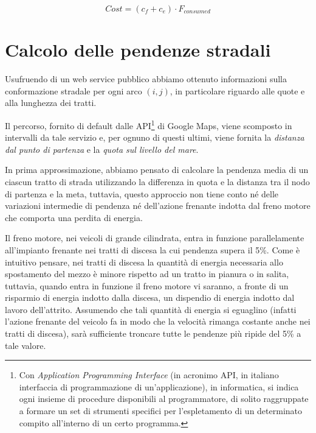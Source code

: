 	\begin{equation}
		\label{eq:overall_cost}
		Cost = (c_f + c_e) \cdot F_{consumed}
	\end{equation}


\section{Calcolo delle pendenze stradali}
\label{sec:calcolo_pendenze}
	Usufruendo di un web service pubblico \cite{web-service} abbiamo ottenuto informazioni sulla conformazione stradale per ogni arco $(i,j)$, in particolare riguardo alle quote e alla lunghezza dei tratti.

	Il percorso, fornito di default dalle API\footnote{Con \emph{Application Programming Interface} (in acronimo API, in italiano interfaccia di programmazione di un'applicazione), in informatica, si indica ogni insieme di procedure disponibili al programmatore, di solito raggruppate a formare un set di strumenti specifici per l'espletamento di un determinato compito all'interno di un certo programma.} di Google Maps, viene scomposto in intervalli da tale servizio e, per ognuno di questi ultimi, viene fornita la \emph{distanza dal punto di partenza} e la \emph{quota sul livello del mare}.

	In prima approssimazione, abbiamo pensato di calcolare la pendenza media di un ciascun tratto di strada utilizzando la differenza in quota e la distanza tra il nodo di partenza e la meta, tuttavia, questo approccio non tiene conto né delle variazioni intermedie di pendenza né dell’azione frenante indotta dal freno motore che comporta una perdita di energia.

	Il freno motore, nei veicoli di grande cilindrata, entra in funzione parallelamente all’impianto frenante nei tratti di discesa la cui pendenza supera il 5\%. Come è intuitivo pensare, nei tratti di discesa la quantità di energia necessaria allo spostamento del mezzo è minore rispetto ad un tratto in pianura o in salita, tuttavia, quando entra in funzione il freno motore vi saranno, a fronte di un risparmio di energia indotto dalla discesa, un dispendio di energia indotto dal lavoro dell’attrito. Assumendo che tali quantità di energia si eguaglino (infatti l’azione frenante del veicolo fa in modo che la velocità rimanga costante anche nei tratti di discesa), sarà sufficiente troncare tutte le pendenze più ripide del 5\% a tale valore.

